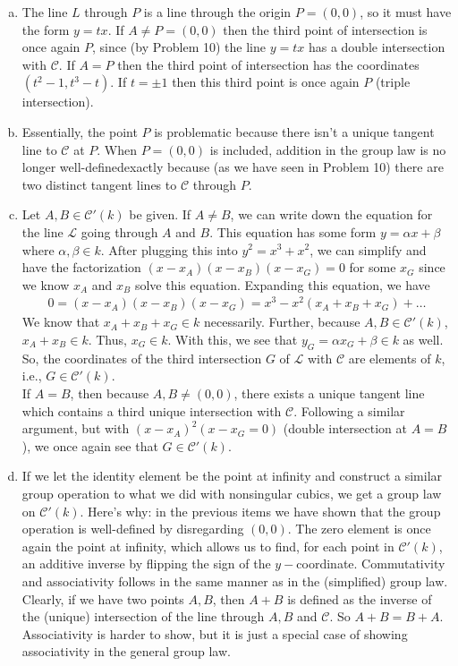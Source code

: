\documentclass[12pt]{article}
\newcommand{\al}{\alpha}
\newcommand{\be}{\beta}
\begin{document}
\begin{enumerate}[(a)]
	\item The line $L$ through $P$ is a line through the origin $P=(0,0)$, so it must have the form $y = tx$. If $A \neq P = (0,0)$ then the third point of intersection is once again $P$, since (by Problem 10) the line $y = tx$ has a double intersection with $\mathcal{C}$. If $A = P$ then the third point of intersection has the coordinates $(t^2-1, t^3-t)$. If $t = \pm 1$ then this third point is once again $P$ (triple intersection). 
	\item Essentially, the point $P$ is problematic because there isn't a unique tangent line to $\mathcal{C}$ at $P$. When $P = (0,0)$ is included, addition in the group law is no longer well-defined\textemdash exactly because (as we have seen in Problem 10) there are two distinct tangent lines to $\mathcal{C}$ through $P$.  
	\item  Let $A,B\in \mathcal{C}'(k)$ be given. If $A\neq B$, we can write down the equation for the line $\mathcal{L}$ going through $A$ and $B$. This equation has some form $y = \al x + \be$ where $\al,\be \in k$. After plugging this into $y^2 = x^3 + x^2$, we can simplify and have the factorization $(x-x_A)(x-x_B)(x-x_G) = 0$ for some $x_G$ since we know $x_A$ and $x_B$ solve this equation. Expanding this equation, we have
	\begin{align}
	0 = (x-x_A)(x-x_B)(x-x_G) = x^3 - x^2(x_A+x_B+x_G) + \dots
	\end{align}
	We know that $x_A+x_B+x_G \in k$ necessarily. Further, because $A,B \in \mathcal{C}'(k)$, $x_A + x_B \in k$. Thus, $x_G \in k$. With this, we see that $y_G = \al x_G + \be \in k$ as well. So, the coordinates of the third intersection $G$ of $\mathcal{L}$ with $\mathcal{C}$ are elements of $k$, i.e., $G \in \mathcal{C}'(k)$.  \\
	
	If $A = B$, then because $A,B \neq (0,0)$, there exists a unique tangent line which contains a third unique intersection with $\mathcal{C}$. Following a similar argument, but with $(x-x_A)^2(x-x_G = 0)$ (double intersection at $A=B$), we once again see that $G \in \mathcal{C}'(k)$. 
	
	
	\item If we let the identity element be the point at infinity and construct a similar group operation to what we did with nonsingular cubics, we get a group law on $\mathcal{C}'(k)$. Here's why: in the previous items we have shown that the group operation is well-defined by disregarding $(0,0)$. The zero element is once again the point at infinity, which allows us to find, for each point in $\mathcal{C}'(k)$, an additive inverse by flipping the sign of the $y-$coordinate. Commutativity and associativity follows in the same manner as in the (simplified) group law. Clearly, if we have two points $A,B$, then $A+B$ is defined as the inverse of the (unique) intersection of the line through $A,B$ and $\mathcal{C}$. So $A+B = B+A$. Associativity is harder to show, but it is just a special case of showing associativity in the general group law.
	
	
\end{enumerate}
\end{document}
